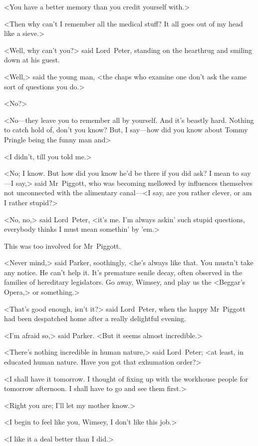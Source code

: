 <You have a better memory than you credit yourself with.>

<Then why can't I remember all the medical stuff? It all goes out of my head like a sieve.>

<Well, why can't you?> said Lord~Peter, standing on the hearthrug and smiling down at his guest.

<Well,> said the young man, <the chaps who examine one don't ask the same sort of questions you do.>

<No?>

<No—they leave you to remember all by yourself. And it's beastly hard. Nothing to catch hold of, don't you know? But, I say—how did you know about Tommy Pringle being the funny man and\longdash>

<I didn't, till you told me.>

<No; I know. But how did you know he'd be there if you did ask? I mean to say—I say,> said Mr~Piggott, who was becoming mellowed by influences themselves not unconnected with the alimentary canal—<I say, are you rather clever, or am I rather stupid?>

<No, no,> said Lord~Peter, <it's me. I'm always askin' such stupid questions, everybody thinks I must mean somethin' by 'em.>

This was too involved for Mr~Piggott.

<Never mind,> said Parker, soothingly, <he's always like that. You mustn't take any notice. He can't help it. It's premature senile decay, often observed in the families of hereditary legislators. Go away, Wimsey, and play us the <Beggar's Opera,> or something.>

<That's good enough, isn't it?> said Lord~Peter, when the happy Mr~Piggott had been despatched home after a really delightful evening.

<I'm afraid so,> said Parker. <But it seems almost incredible.>

<There's nothing incredible in human nature,> said Lord~Peter; <at least, in educated human nature. Have you got that exhumation order?>

<I shall have it tomorrow. I thought of fixing up with the workhouse people for tomorrow afternoon. I shall have to go and see them first.>

<Right you are; I'll let my mother know.>

<I begin to feel like you, Wimsey, I don't like this job.>

<I like it a deal better than I did.>

